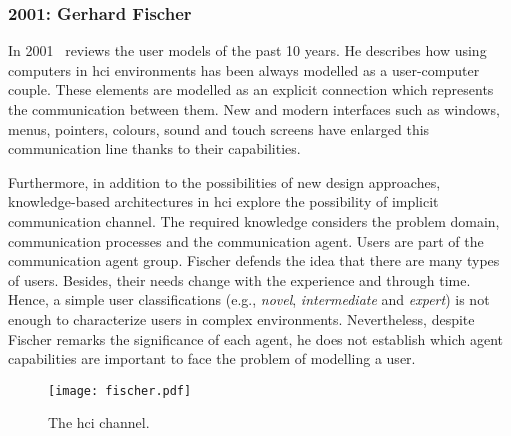 \subsubsection{2001: Gerhard Fischer}
\label{sec:fischer_user_2001}

In 2001~\citet{fischer_user_2001} reviews the user models of the past 10 years. 
He describes how using computers in \ac{hci} environments has been always
modelled as a user-computer couple. These elements are modelled as an explicit 
connection which represents the communication between them. New and modern 
interfaces such as windows, menus, pointers, colours, sound and touch screens 
have enlarged this communication line thanks to their capabilities.

Furthermore, in addition to the possibilities of new design approaches,
knowledge-based architectures in \ac{hci} explore the possibility of implicit
communication channel. The required knowledge considers the problem domain,
communication processes and the communication agent. Users are part of the
communication agent group. Fischer defends the idea that there are many types of
users. Besides, their needs change with the experience and through time.
Hence, a simple user classifications (e.g., \textit{novel}, \textit{intermediate}
and \textit{expert}) is not enough to characterize users in complex environments. 
Nevertheless, despite Fischer remarks the significance of each agent, he does 
not establish which agent capabilities are important to face the problem of 
modelling a user.


\begin{figure}[H]
\centering
\texttt{[image: fischer.pdf]}
\caption{The \ac{hci} channel.}
\label{fig:fischer}
\end{figure}
